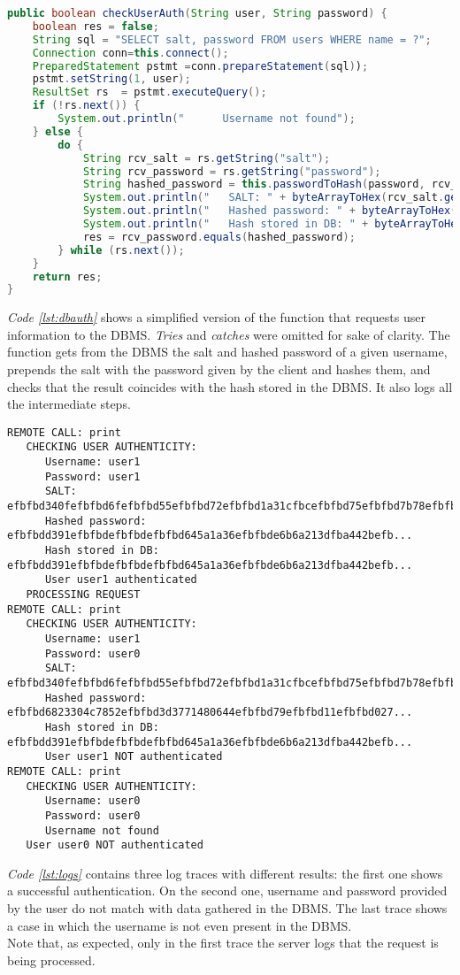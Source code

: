 \begin{lstlisting}[language=Java, caption={checkUserAuth function (simplified)}, label={lst:dbauth}, basicstyle=\scriptsize]
public boolean checkUserAuth(String user, String password) {
    boolean res = false;
    String sql = "SELECT salt, password FROM users WHERE name = ?";
    Connection conn=this.connect();
    PreparedStatement pstmt =conn.prepareStatement(sql));
    pstmt.setString(1, user);
    ResultSet rs  = pstmt.executeQuery();
    if (!rs.next()) {
        System.out.println("      Username not found");
    } else {
        do {
            String rcv_salt = rs.getString("salt");
            String rcv_password = rs.getString("password");
            String hashed_password = this.passwordToHash(password, rcv_salt);
            System.out.println("   SALT: " + byteArrayToHex(rcv_salt.getBytes()));
            System.out.println("   Hashed password: " + byteArrayToHex(hashed_password.getBytes()));
            System.out.println("   Hash stored in DB: " + byteArrayToHex(rcv_password.getBytes()));
            res = rcv_password.equals(hashed_password);
        } while (rs.next());
    }
    return res;
}
\end{lstlisting}
\textit{Code \ref{lst:dbauth}} shows a simplified version of the function that requests user information to the DBMS. \textit{Tries} and \textit{catches} were omitted for sake of clarity. The function gets from the DBMS the salt and hashed password of a given username, prepends the salt with the password given by the client and hashes them, and checks that the result coincides with the hash stored in the DBMS. It also logs all the intermediate steps.
\begin{lstlisting}[caption={Server logs}, label={lst:logs}, basicstyle=\scriptsize]
REMOTE CALL: print
   CHECKING USER AUTHENTICITY:
      Username: user1
      Password: user1
      SALT: efbfbd340fefbfbd6fefbfbd55efbfbd72efbfbd1a31cfbcefbfbd75efbfbd7b78efbfbd
      Hashed password: efbfbdd391efbfbdefbfbdefbfbd645a1a36efbfbde6b6a213dfba442befb...
      Hash stored in DB: efbfbdd391efbfbdefbfbdefbfbd645a1a36efbfbde6b6a213dfba442befb...
      User user1 authenticated
   PROCESSING REQUEST
REMOTE CALL: print
   CHECKING USER AUTHENTICITY:
      Username: user1
      Password: user0
      SALT: efbfbd340fefbfbd6fefbfbd55efbfbd72efbfbd1a31cfbcefbfbd75efbfbd7b78efbfbd
      Hashed password: efbfbd6823304c7852efbfbd3d3771480644efbfbd79efbfbd11efbfbd027...
      Hash stored in DB: efbfbdd391efbfbdefbfbdefbfbd645a1a36efbfbde6b6a213dfba442befb...
      User user1 NOT authenticated
REMOTE CALL: print
   CHECKING USER AUTHENTICITY:
      Username: user0
      Password: user0
      Username not found
   User user0 NOT authenticated
\end{lstlisting}
\textit{Code \ref{lst:logs}} contains three log traces with different results: the first one shows a successful authentication. On the second one, username and password provided by the user do not match with data gathered in the DBMS. The last trace shows a case in which the username is not even present in the DBMS.\\
Note that, as expected, only in the first trace the server logs that the request is being processed.